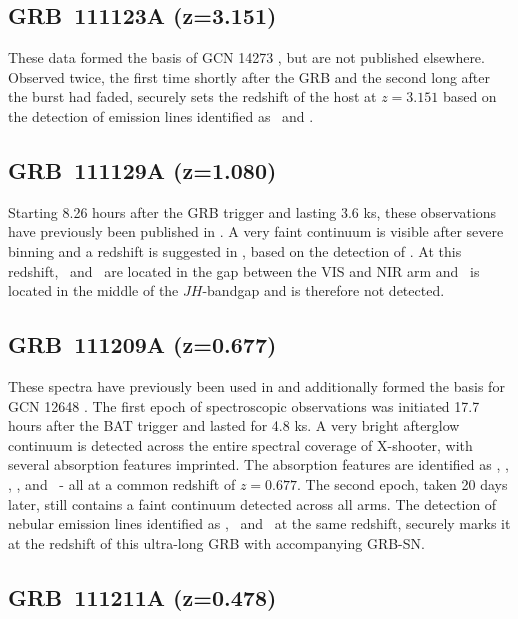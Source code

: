\documentclass[longauth]{aa}    %
\begin{document}
\subsection{GRB~111123A  (z=3.151)} \label{111123}

These data formed the basis of GCN 14273 \citep{GCN14273}, but are not published
elsewhere. Observed twice, the first time shortly after the GRB and the second
long after the burst had faded, securely sets the redshift of the host at $z =
3.151$ based on the detection of emission lines identified as \oii~and \oiii.

\subsection{GRB~111129A (z=1.080)} \label{111129}

Starting 8.26 hours after the GRB trigger and lasting 3.6 ks, these observations have previously
been published in \citet{Kruhler2015}. A very faint continuum is visible after
severe binning and a redshift is suggested in \citet{Kruhler2015}, based on the
detection of \oii. At this redshift, \hb~and \oii~are located in the gap between
the VIS and NIR arm and \ha~is located in the middle of the $JH$-bandgap and is
therefore not detected.

\subsection{GRB~111209A (z=0.677)} \label{111209}

These spectra have previously been used in \citet{Levan2013, Greiner2015,
	Kruhler2015, Kann2017} and additionally formed the basis for GCN 12648
\citep{GCN12648}. The first epoch of spectroscopic observations was initiated
17.7 hours after the BAT trigger and lasted for 4.8 ks. A very bright
afterglow continuum is detected across the entire spectral coverage of
X-shooter, with several absorption features imprinted. The absorption features
are identified as \feii, \mgii, \mgi, \cah, and \cak~- all at a common redshift
of $z = 0.677$. The second epoch, taken 20 days later, still contains a faint
continuum detected across all arms. The detection of nebular emission lines
identified as \oii, \oii~and \ha~at the same redshift, securely marks it at the
redshift of this ultra-long GRB with accompanying GRB-SN.

\subsection{GRB~111211A (z=0.478)} \label{111211}
\end{document}
